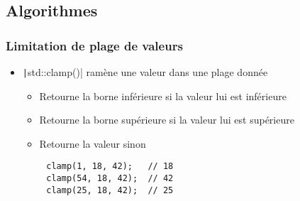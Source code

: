 \documentclass[C++.tex]{subfiles}
\begin{document}
\subsection*{Algorithmes}
\begin{frame}[fragile]
	\frametitle{Limitation de plage de valeurs}
	\begin{itemize}
		\item \texttt|std::clamp()| ramène une valeur dans une plage donnée
		\begin{itemize}
			\item Retourne la borne inférieure si la valeur lui est inférieure
			\item Retourne la borne supérieure si la valeur lui est supérieure
			\item Retourne la valeur sinon
		\end{itemize}
	\end{itemize}

	\begin{verbatim}
		clamp(1, 18, 42);   // 18
		clamp(54, 18, 42);  // 42
		clamp(25, 18, 42);  // 25
	\end{verbatim}


\end{frame}
\end{document}

